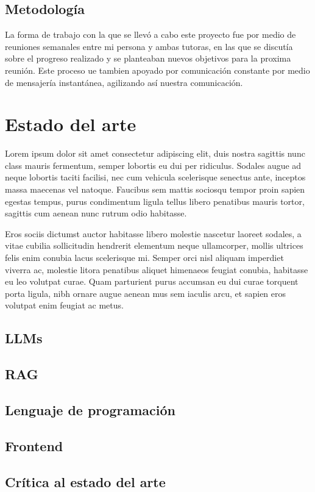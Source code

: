 \documentclass{article}
\begin{document}
\subsection{Metodología}
La forma de trabajo con la que se llevó a cabo este proyecto fue por medio de reuniones semanales entre mi persona y ambas tutoras, en las que se discutía sobre el progreso realizado y se planteaban nuevos objetivos para la proxima reunión. Este proceso ue tambien apoyado por comunicación constante por medio de mensajería instantánea, agilizando así nuestra comunicación. 
\newpage

\section{Estado del arte}
Lorem ipsum dolor sit amet consectetur adipiscing elit, duis nostra sagittis nunc class mauris fermentum, semper lobortis eu dui per ridiculus. Sodales augue ad neque lobortis taciti facilisi, nec cum vehicula scelerisque senectus ante, inceptos massa maecenas vel natoque. Faucibus sem mattis sociosqu tempor proin sapien egestas tempus, purus condimentum ligula tellus libero penatibus mauris tortor, sagittis cum aenean nunc rutrum odio habitasse.

Eros sociis dictumst auctor habitasse libero molestie nascetur laoreet sodales, a vitae cubilia sollicitudin hendrerit elementum neque ullamcorper, mollis ultrices felis enim conubia lacus scelerisque mi. Semper orci nisl aliquam imperdiet viverra ac, molestie litora penatibus aliquet himenaeos feugiat conubia, habitasse eu leo volutpat curae. Quam parturient purus accumsan eu dui curae torquent porta ligula, nibh ornare augue aenean mus sem iaculis arcu, et sapien eros volutpat enim feugiat ac metus.
\subsection{LLMs}
\subsection{RAG}
\subsection{Lenguaje de programación}
\subsection{Frontend}
\subsection{Crítica al estado del arte}
\newpage
\end{document}
